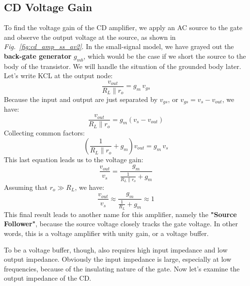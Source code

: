 \subsection{CD Voltage Gain}
To find the voltage gain of the CD amplifier, we apply an AC source to the gate and observe the output voltage at the source, as shown in \emph{Fig.~\ref{fig:cd_amp_ss_av2}}.  In the small-signal model, we have grayed out the \textbf{back-gate generator} $g_{mb}$, which would be the case if we short the source to the body of the transistor.  We will handle the situation of the grounded body later. Let's write KCL at the output node:
    \begin{equation}
        \frac{v_{out}}{R_L \parallel r_o} = g_m\,v_{gs}
    \end{equation}
Because the input and output are just separated by $v_{gs}$, or $v_{gs} = v_{s} - v_{out}$, we have:
    \begin{equation}
        \frac{v_{out}}{R_L \parallel r_o} = g_m(v_s - v_{out})
    \end{equation}
Collecting common factors:
    \begin{equation}
        \left(\frac{1}{R_L \parallel r_o} + g_m\right)v_{out} = g_m\,v_s
    \end{equation}
This last equation leads us to the voltage gain:
    \begin{equation}
        \frac{v_{out}}{v_s} = \frac{g_m}{\frac{1}{R_L \parallel r_o} + {g_m}}
    \end{equation}
Assuming that $r_o \gg R_L$, we have:
    \begin{equation}
        \frac{v_{out}}{v_s} \approx \frac{g_m}{\frac{1}{R_L} + g_m} \approx 1
    \end{equation}
This final result leads to another name for this amplifier, namely the \textbf{"Source Follower"}, because the source voltage closely tracks the gate voltage.  In other words, this is a voltage amplifier with unity gain, or a voltage buffer.

To be a voltage buffer, though, also requires high input impedance and low output impedance.  Obviously the input impedance is large, especially at low frequencies, because of the insulating nature of the gate.  Now let's examine the output impedance of the CD.

